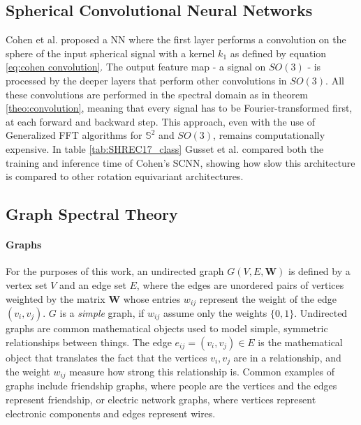 \subsection{Spherical Convolutional Neural Networks}\label{sec:Chapter1:SCNN}
Cohen et al. \cite{SCNN} proposed a NN where the first layer performs a convolution on the sphere of the input spherical signal with a kernel $k_1$ as defined by equation \ref{eq:cohen convolution}. The output feature map - a signal on $SO(3)$ - is processed by the deeper layers that perform other convolutions in $SO(3)$. All these convolutions are performed in the spectral domain as in theorem \ref{theo:convolution}, meaning that every signal has to be Fourier-transformed first, at each forward and backward step. This approach, even with the use of Generalized FFT algorithms for $\mathbb S^2$ and $SO(3)$, remains computationally expensive. In table \ref{tab:SHREC17_class} Gusset et al. \cite{Gusset} compared both the training and inference time of Cohen's SCNN, showing how slow this architecture is compared to other rotation equivariant architectures.
\subsection{Graph Spectral Theory} \label{sec:Chapter1: Spectral Graph Theory}
\paragraph{Graphs}
For the purposes of this work, an undirected graph $G(V, E, \mathbf W)$ is defined by a vertex set $V$ and an edge set $E$, where the edges are unordered pairs of vertices weighted by the matrix $\mathbf W$ whose entries $w_{ij}$ represent the weight of the edge $(v_i, v_j)$. $G$ is a \textit{simple} graph, if $w_{ij}$ assume only the weights $\{0, 1\}$. Undirected graphs are common mathematical objects used to model simple, symmetric relationships between things. The edge $e_{ij} = (v_i, v_j) \in E$ is the mathematical object that translates the fact that the vertices $v_i, v_j$ are in a relationship, and the weight $w_{ij}$ measure how strong this relationship is. Common examples of graphs include friendship graphs, where people are the vertices and the edges represent friendship, or electric network graphs, where vertices represent electronic components and edges represent wires.
